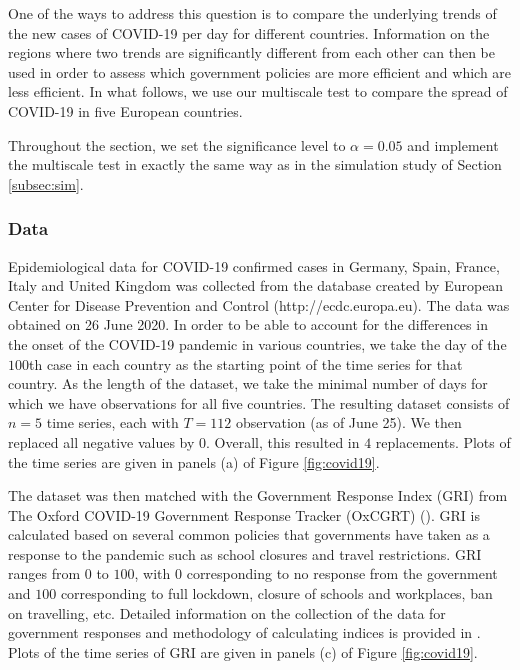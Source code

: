 \documentclass[a4paper,12pt]{article}
\numberwithin{equation}{section}
\begin{document}
One of the ways to address this question is to compare the underlying trends of the new cases of COVID-19 per day for different countries. Information on the regions where two trends are significantly different from each other can then be used in order to assess which government policies are more efficient and which are less efficient. In what follows, we use our multiscale test to compare the spread of COVID-19 in five European countries.

Throughout the section, we set the significance level to $\alpha=0.05$ and implement the multiscale test in exactly the same way as in the simulation study of Section \ref{subsec:sim}. 

\subsubsection{Data}
Epidemiological data for COVID-19 confirmed cases in Germany, Spain, France, Italy and United Kingdom was collected from the database created by European Center for Disease Prevention and Control (http://ecdc.europa.eu). The data was obtained on 26 June 2020. In order to be able to account for the differences in the onset of the COVID-19 pandemic in various countries, we take the day of the $100$th case in each country as the starting point of the time series for that country. As the length of the dataset, we take the minimal number of days for which we have observations for all five countries. The resulting dataset consists of $n = 5$ time series, each with $T = 112$ observation (as of June 25). We then replaced all negative values by $0$. Overall, this resulted in $4$ replacements. Plots of the time series are given in panels (a) of Figure \ref{fig:covid19}.

The dataset was then matched with the Government Response Index (GRI) from The Oxford COVID-19 Government Response Tracker (OxCGRT) \linebreak (\cite{Hale2020}). GRI is calculated based on several common policies that governments have taken as a response to the pandemic such as school closures and travel restrictions. GRI ranges from $0$ to $100$, with $0$ corresponding to no response from the government and $100$ corresponding to full lockdown, closure of schools and workplaces, ban on travelling, etc. Detailed information on the collection of the data for government responses and methodology of calculating indices is provided in \cite{Hale2020paper}. Plots of the time series of GRI are given in panels (c) of Figure \ref{fig:covid19}.
\end{document}
